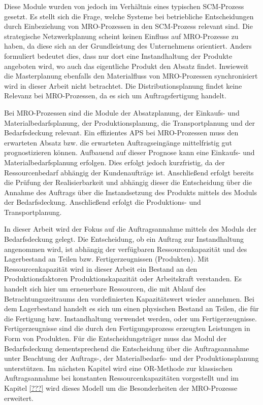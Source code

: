 Diese Module wurden von \cite{meyr2015structure} jedoch im Verhältnis eines typischen SCM-Prozess gesetzt. Es stellt sich die Frage, welche Systeme bei betriebliche Entscheidungen durch Einbeziehung von MRO-Prozessen in den SCM-Prozess relevant sind. Die strategische Netzwerkplanung scheint keinen Einfluss auf MRO-Prozesse zu haben, da diese sich an der Grundleistung des Unternehmens orientiert. Anders formuliert bedeutet dies, dass nur dort eine Instandhaltung der Produkte angeboten wird, wo auch das eigentliche Produkt den Absatz findet. Inwieweit die Masterplanung ebenfalls den Materialfluss von MRO-Prozessen synchronisiert wird in dieser Arbeit nicht betrachtet. Die Distributionsplanung findet keine Relevanz bei MRO-Prozessen, da es sich um Auftragsfertigung handelt.

Bei MRO-Prozessen sind die Module der Absatzplanung, der Einkaufs- und Materialbedarfsplanung, der Produktionsplanung, die Transportplanung und der Bedarfsdeckung relevant. Ein effizientes APS bei MRO-Prozessen muss den erwarteten Absatz bzw. die erwarteten Auftragseingänge mittelfristig gut prognostizieren können. Aufbauend auf dieser Prognose kann eine Einkaufs- und Materialbedarfsplanung erfolgen. Dies erfolgt jedoch kurzfristig, da der Ressourcenbedarf abhängig der Kundenaufträge ist. Anschließend erfolgt bereits die Prüfung der Realisierbarkeit und abhängig dieser die Entscheidung über die Annahme des Auftrags über die Instandsetzung des Produkts mittels des Moduls der Bedarfsdeckung. Anschließend erfolgt die Produktions- und Transportplanung.

In dieser Arbeit wird der Fokus auf die Auftragsannahme mittels des Moduls der Bedarfsdeckung gelegt. Die Entscheidung, ob ein Auftrag zur Instandhaltung angenommen wird, ist abhängig der verfügbaren Ressourcenkapazität und des Lagerbestand an Teilen bzw. Fertigerzeugnissen (Produkten). %
Mit Ressourcenkapazität wird in dieser Arbeit ein Bestand an den Produktionsfaktoren Produktionskapazität oder Arbeitskraft verstanden. Es handelt sich hier um erneuerbare Ressourcen, die mit Ablauf des Betrachtungszeitraums den vordefinierten Kapazitätswert wieder annehmen. Bei dem Lagerbestand handelt es sich um einen physischen Bestand an Teilen, die für die Fertigung bzw. Instandhaltung verwendet werden, oder um Fertigerzeugnisse. Fertigerzeugnisse sind die durch den Fertigungsprozess erzeugten Leistungen in Form von Produkten. Für die Entscheidungsträger muss das Modul der Bedarfsdeckung dementsprechend die Entscheidung über die Auftragsannahme unter Beachtung der Auftrags-, der Materialbedarfs- und der Produktionsplanung unterstützen. Im nächsten Kapitel wird eine OR-Methode zur klassischen Auftragsannahme bei konstanten Ressourcenkapazitäten vorgestellt und im Kapitel \ref{???} wird dieses Modell um die Besonderheiten der MRO-Prozesse erweitert.





